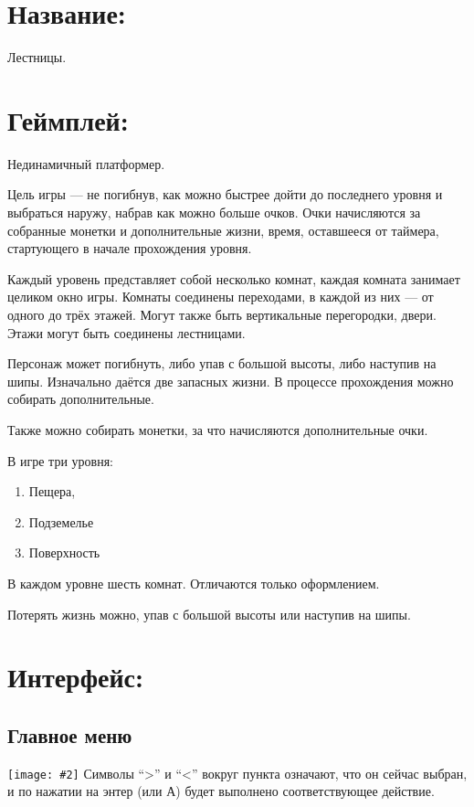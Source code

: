 \documentclass[12pt,a4paper]{article}
\begin{document}
\newcommand{\pic}[2] {
  \texttt{[image: \#2]}}

\section{Название:} Лестницы.
\section{Геймплей:} Нединамичный платформер.

Цель игры --- не погибнув, как можно быстрее дойти до последнего уровня и выбраться наружу, набрав как можно больше очков. Очки начисляются за собранные монетки и дополнительные жизни, время, оставшееся от таймера, стартующего в начале прохождения уровня.

Каждый уровень представляет собой несколько комнат, каждая комната занимает целиком окно игры. Комнаты соединены переходами, в каждой из них --- от одного до трёх этажей. Могут также быть вертикальные перегородки, двери. Этажи могут быть соединены лестницами.

Персонаж может погибнуть, либо упав с большой высоты, либо наступив на шипы. Изначально даётся две запасных жизни. В процессе прохождения можно собирать дополнительные.

Также можно собирать монетки, за что начисляются дополнительные очки.

В игре три уровня:
\begin{enumerate}
\item Пещера,
\item Подземелье
\item Поверхность
\end{enumerate}
В каждом уровне шесть комнат. Отличаются только оформлением.

Потерять жизнь можно, упав с большой высоты или наступив на шипы.

\section{Интерфейс:}
\subsection{Главное меню}

\noindent \pic{0.27}{mainmenu}
Символы ``>'' и ``<'' вокруг пункта означают, что он сейчас выбран, и по нажатии на энтер (или А) будет выполнено соответствующее действие.
\end{document}
